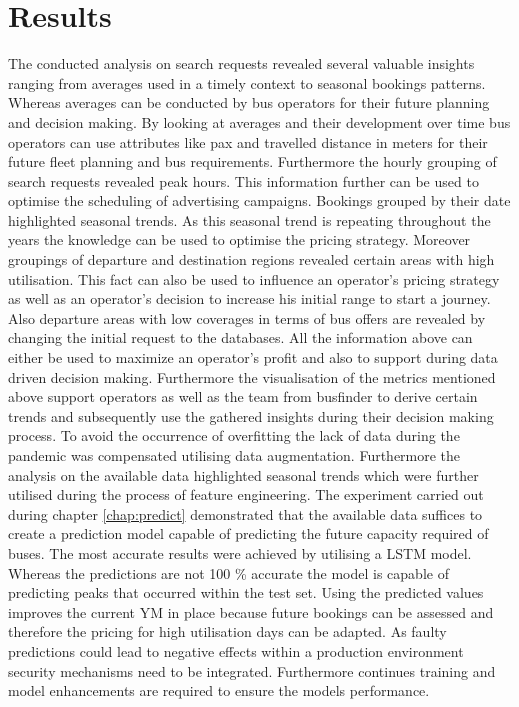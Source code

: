 %
%
% 
% 
% 

\chapter{Results}
\label{chap:results}
The conducted analysis on search requests revealed several valuable insights ranging from averages used in a timely context to seasonal bookings patterns. Whereas averages can be conducted by bus operators for their future planning and decision making. By looking at averages and their development over time bus operators can use attributes like pax and travelled distance in meters for their future fleet planning and bus requirements. Furthermore the hourly grouping of search requests revealed peak hours. This information further can be used to optimise the scheduling of advertising campaigns. Bookings grouped by their date highlighted seasonal trends. As this seasonal trend is repeating throughout the years the knowledge can be used to optimise the pricing strategy. Moreover groupings of departure and destination regions revealed certain areas with high utilisation. This fact can also be used to influence an operator's pricing strategy as well as an operator's decision to increase his initial range to start a journey. Also departure areas with low coverages in terms of bus offers are revealed by changing the initial request to the databases. All the information above can either be used to maximize an operator's profit and also to support during data driven decision making. Furthermore the visualisation of the metrics mentioned above support operators as well as the team from busfinder to derive certain trends and subsequently use the gathered insights during their decision making process. 
\newline
\newline
To avoid the occurrence of overfitting the lack of data during the pandemic was compensated utilising data augmentation. Furthermore the analysis on the available data highlighted seasonal trends which were further utilised during the process of feature engineering. 
The experiment carried out during chapter \ref{chap:predict} demonstrated that the available data suffices to create a prediction model capable of predicting the future capacity required of buses. The most accurate results were achieved by utilising a LSTM model. Whereas the predictions are not 100 \% accurate the model is capable of predicting peaks that occurred within the test set. Using the predicted values improves the current YM in place because future bookings can be assessed and therefore the pricing for high utilisation days can be adapted. As faulty predictions could lead to negative effects within a production environment security mechanisms need to be integrated. Furthermore continues training and model enhancements are required to ensure the models performance.